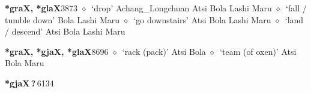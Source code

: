  \begin{list}{}{\leftmargin=1.5em \itemindent=-1.5em}
  \item {\footnotesize \textbf{*graX, *glaX}}{\tiny 3873}
         $\diamond$~`drop'
         Achang\_Longchuan 
\hspace{1ex}
         Atsi 
\hspace{1ex}
         Bola 
\hspace{1ex}
         Lashi 
\hspace{1ex}
         Maru 
\hspace{1ex}
         $\diamond$~`fall / tumble down'
         Bola 
\hspace{1ex}
         Lashi 
\hspace{1ex}
         Maru 
\hspace{1ex}
         $\diamond$~`go downstairs'
         Atsi 
\hspace{1ex}
         Bola 
\hspace{1ex}
         Lashi 
\hspace{1ex}
         Maru 
\hspace{1ex}
         $\diamond$~`land / descend'
         Atsi 
\hspace{1ex}
         Bola 
\hspace{1ex}
         Lashi 
\hspace{1ex}
         Maru 
  \item {\footnotesize \textbf{*graX, *gjaX, *glaX}}{\tiny 8696}
\hspace{1ex}
         $\diamond$~`rack (pack)'
         Atsi 
\hspace{1ex}
         Bola 
\hspace{1ex}
         $\diamond$~`team (of oxen)'
         Atsi 
\hspace{1ex}
         Bola 
\hspace{1ex}
         Maru 
  \item {\footnotesize \textbf{*gjaX\,?\,}}{\tiny 6134}

\end{list}
